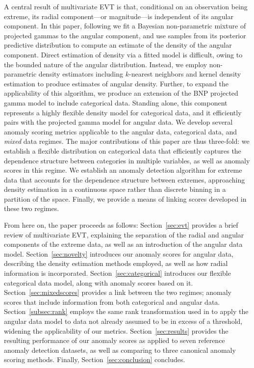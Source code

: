 A central result of multivariate EVT is that, conditional on an observation 
    being extreme, its radial component---or magnitude---is independent of its 
    angular component.  In this paper, following \cite{trubey:pg}
    we fit a Bayesian non-parametric mixture 
    of projected gammas to the angular component, and use samples from its 
    posterior predictive distribution to compute an estimate of the density 
    of the angular component.   Direct estimation of density via a fitted model
    is difficult, owing to the bounded nature of the angular distribution.  
    Instead, we employ non-parametric density estimators including $k$-nearest 
    neighbors and kernel density estimation to produce estimates of angular 
    density.  Further, to expand the applicability of this algorithm, we 
    produce an extension of the BNP projected gamma model to include categorical 
    data.   Standing alone, this component represents a highly flexible density 
    model for categorical data, and it efficiently pairs with the projected 
    gamma model for angular data.  We develop several anomaly scoring metrics 
    applicable to the angular data, categorical data, and \emph{mixed} data 
    regimes.  The major contributions of this paper are thus three-fold: we 
    establish a flexible distribution on categorical data that efficiently
    captures the dependence structure between categories in multiple variables, 
    as well as anomaly scores in this regime.  We establish an anomaly detection 
    algorithm for extreme data that accounts for the dependence structure 
    between extremes, approaching density estimation in a continuous space 
    rather than discrete binning in a partition of the space.  Finally, we 
    provide a means of linking scores developed in these two regimes.

From here on, the paper proceeds as follows: Section~\ref{sec:evt} provides a 
    brief review of multivariate EVT, explaining the separation of the radial 
    and angular components of the extreme data, as well as an introduction of 
    the angular data model.  Section~\ref{sec:novelty} introduces our anomaly 
    scores for angular data, describing the density estimation methods employed, 
    as well as how radial information is incorporated.  
    Section~\ref{sec:categorical} introduces our flexible categorical data 
    model, along with anomaly scores based on it. 
    Section~\ref{sec:mixedscores} provides a link between the two regimes; 
    anomaly scores that include information from both categorical and angular 
    data.  
    Section~\ref{subsec:rank} employs the same rank transformation used in 
    \cite{goix2017} to apply the angular data model to data not already assumed 
    to be in excess of a threshold, widening the applicability of our metrics.
    Section~\ref{sec:results} provides the resulting performance of our anomaly 
    scores as applied to seven reference anomaly detection datasets, as well as 
    comparing to three canonical anomaly scoring methods.  
    Finally, Section~\ref{sec:conclusion} concludes.

